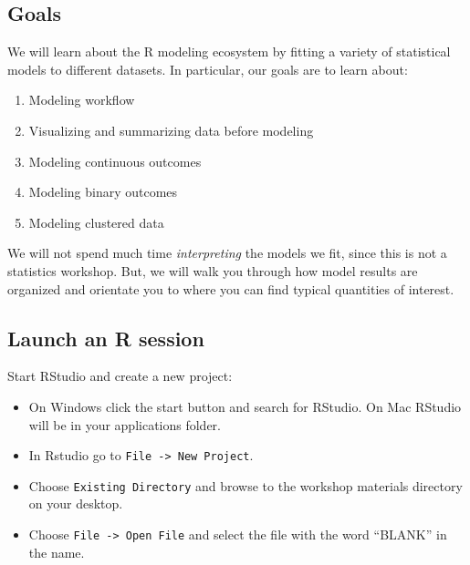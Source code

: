 \documentclass[
]{book}
\providecommand{\tightlist}{%
  \setlength{\itemsep}{0pt}\setlength{\parskip}{0pt}}
\begin{document}
\hypertarget{goals-1}{%
\subsection{Goals}\label{goals-1}}

\begin{alert}

We will learn about the R modeling ecosystem by fitting a variety of statistical models to different datasets. In particular, our goals are to learn about:

\begin{enumerate}
\def\labelenumi{\arabic{enumi}.}
\tightlist
\item
  Modeling workflow
\item
  Visualizing and summarizing data before modeling
\item
  Modeling continuous outcomes
\item
  Modeling binary outcomes
\item
  Modeling clustered data
\end{enumerate}

We will not spend much time \emph{interpreting} the models we fit, since this is not a statistics workshop. But, we will walk you through how model results are organized and orientate you to where you can find typical quantities of interest.

\end{alert}

\hypertarget{launch-an-r-session}{%
\subsection{Launch an R session}\label{launch-an-r-session}}

Start RStudio and create a new project:

\begin{itemize}
\tightlist
\item
  On Windows click the start button and search for RStudio. On Mac RStudio will be in your applications folder.
\item
  In Rstudio go to \texttt{File\ -\textgreater{}\ New\ Project}.
\item
  Choose \texttt{Existing\ Directory} and browse to the workshop materials directory on your desktop.
\item
  Choose \texttt{File\ -\textgreater{}\ Open\ File} and select the file with the word ``BLANK'' in the name.
\end{itemize}
\end{document}
